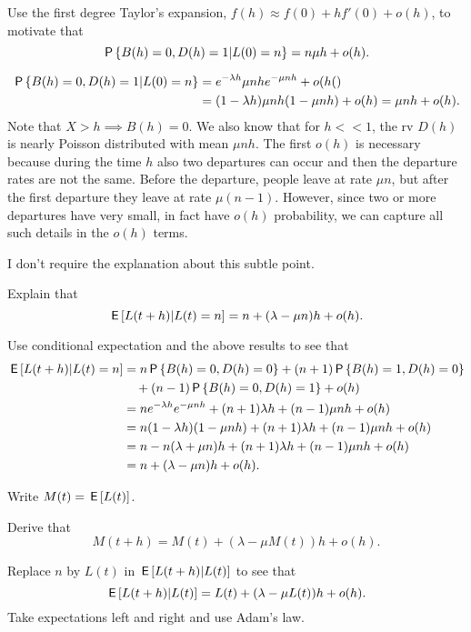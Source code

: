 \begin{exercise}[1]
Use the first degree Taylor's expansion, $f(h) \approx f(0) + hf'(0) + o(h)$, to motivate  that
\begin{equation}
\P{B(h)=0, D(h)=1|L(0) = n} = n \mu h + o(h).
\end{equation}
\begin{solution}
\begin{align}
\P{B(h)=0, D(h)=1|L(0) = n } &=  e^{-\lambda h} \mu n h e^{-\mu n h} +o(h() \\
  &= (1 - \lambda h) \mu n h (1-\mu n h) + o(h) = \mu n h + o(h).
\end{align}
Note that $X>h \implies B(h) = 0$. We also know that for $h<<1$, the rv $D(h)$ is nearly Poisson distributed with mean $\mu n h$.
The first $o(h)$ is necessary because during the time $h$ also two departures can occur and then the departure rates are not the same.
Before the departure, people leave at rate $\mu n$, but after the first departure they leave at rate $\mu (n-1)$. However, since two or more departures have very small, in fact have $o(h)$ probability, we can capture all such details in the $o(h)$ terms.

I don't require the explanation about this subtle point.

\end{solution}
\end{exercise}

\begin{exercise}[2]
Explain that
\begin{equation}
\E{L(t+h) | L(t) =n }   = n  + (\lambda  - \mu n )h + o(h).
\end{equation}
\begin{solution}
Use conditional expectation and the above results to see that
\begin{align}
\E{L(t+h) | L(t)=n }
  &= n \P{B(h)=0, D(h) = 0} + (n+1)\P{B(h)=1, D(h) = 0} \\
  &\quad + (n-1)\P{B(h)=0, D(h) = 1}  + o(h) \\
 &= n e^{-\lambda h} e^{-\mu n h} + (n+1) \lambda h + (n -1)\mu n h + o(h) \\
 &= n (1-\lambda h) (1-\mu n h)  + (n +1) \lambda h + (n -1)\mu n h + o(h) \\
 &= n  - n (\lambda + \mu n) h  + (n +1) \lambda h + (n -1)\mu n h + o(h) \\
 &= n + (\lambda - \mu n) h + o(h).
\end{align}
\end{solution}
\end{exercise}

Write $M(t) = \E{L(t)}$.
\begin{exercise}[1]
Derive that
\begin{equation}
M(t+h)  =  M(t) + (\lambda  - \mu M(t))h + o(h).
\end{equation}
\begin{solution}
  Replace $n$ by $L(t)$ in $\E{L(t+h)|L(t)}$ to see that
\begin{equation}
\E{L(t+h) | L(t) }   = L(t)  + (\lambda  - \mu L(t) )h + o(h).
\end{equation}
Take expectations left and right and use Adam's law.
\end{solution}
\end{exercise}
